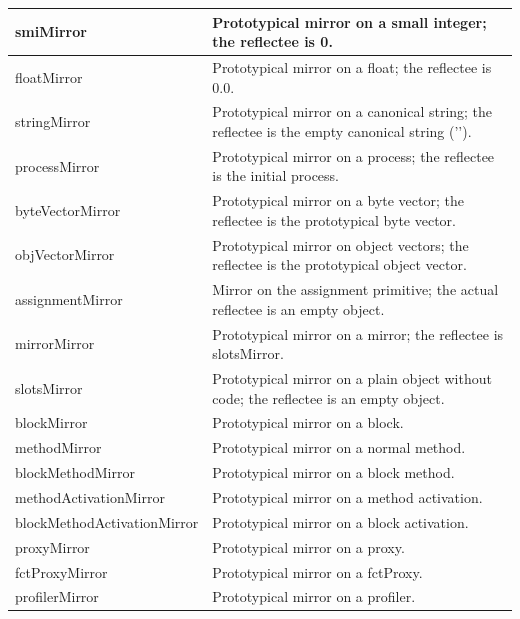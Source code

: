 \documentclass[letterpaper,10pt,english]{sphinxmanual}
\begin{document}
\begin{tabulary}{\linewidth}{p{5cm} p{10cm}}
\hline

smiMirror
 & 
Prototypical mirror on a small integer; the reflectee is 0.
\\\hline

floatMirror
 & 
Prototypical mirror on a float; the reflectee is 0.0.
\\\hline

stringMirror
 & 
Prototypical mirror on a canonical string; the reflectee is the empty canonical string (’’).
\\\hline

processMirror
 & 
Prototypical mirror on a process; the reflectee is the initial process.
\\\hline

byteVectorMirror
 & 
Prototypical mirror on a byte vector; the reflectee is the prototypical byte vector.
\\\hline

objVectorMirror
 & 
Prototypical mirror on object vectors; the reflectee is the prototypical object vector.
\\\hline

assignmentMirror
 & 
Mirror on the assignment primitive; the actual reflectee is an empty object.
\\\hline

mirrorMirror
 & 
Prototypical mirror on a mirror; the reflectee is slotsMirror.
\\\hline

slotsMirror
 & 
Prototypical mirror on a plain object without code; the reflectee is an empty object.
\\\hline

blockMirror
 & 
Prototypical mirror on a block.
\\\hline

methodMirror
 & 
Prototypical mirror on a normal method.
\\\hline

blockMethodMirror
 & 
Prototypical mirror on a block method.
\\\hline

methodActivationMirror
 & 
Prototypical mirror on a method activation.
\\\hline

blockMethodActivationMirror
 & 
Prototypical mirror on a block activation.
\\\hline

proxyMirror
 & 
Prototypical mirror on a proxy.
\\\hline

fctProxyMirror
 & 
Prototypical mirror on a fctProxy.
\\\hline

profilerMirror
 & 
Prototypical mirror on a profiler.
\\\hline
\end{tabulary}
\end{document}
